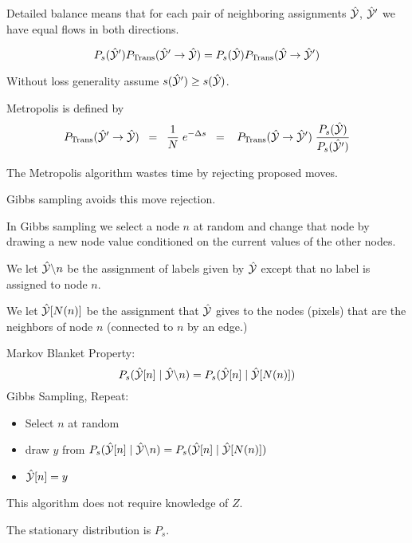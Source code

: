{

Detailed balance means that for each pair of neighboring assignments $\hat{\cal Y}$, $\hat{\cal Y}'$ we have equal flows in both directions.

\vfill
$$P_s(\hat{\cal Y}')P_{\mathrm{Trans}}(\hat{\cal Y}' \rightarrow \hat{\cal Y}) = P_s(\hat{\cal Y})P_{\mathrm{Trans}}(\hat{\cal Y} \rightarrow \hat{\cal Y}')$$

\vfill
Without loss generality assume $s(\hat{\cal Y}') \geq s(\hat{\cal Y})$.

\vfill
Metropolis is defined by
{\huge $$P_{\mathrm{Trans}}(\hat{\cal Y}' \rightarrow \hat{\cal Y}) \;\; = \;\; \frac{1}{N}\;e^{-\Delta s}
\;\;= \;\;\;P_{\mathrm{Trans}}(\hat{\cal Y} \rightarrow \hat{\cal Y}')\;\frac{P_s(\hat{\cal Y})}{P_s(\hat{\cal Y}')}$$}


The Metropolis algorithm wastes time by rejecting proposed moves.

\vfill
Gibbs sampling avoids this move rejection.

\vfill
In Gibbs sampling we select a node $n$ at random and change that node by drawing a new node value conditioned on the current values of the other nodes.

\vfill
We let {\color{red} $\hat{\cal Y} \backslash n$} be the assignment of labels given by $\hat{\cal Y}$ except that no label is assigned to node $n$.

\vfill
We let {\color{red} $\hat{\cal Y}[N(n)]$} be the assignment that $\hat{\cal Y}$ gives to the nodes (pixels) that are the neighbors of node $n$ (connected to $n$ by an edge.)


Markov Blanket Property:
{\color{red} $$P_s(\hat{\cal Y}[n] \;|\;\hat{\cal Y} \backslash n) = P_s(\hat{\cal Y}[n] \;|\; \hat{\cal Y}[N(n)])$$}
\vfill
Gibbs Sampling, Repeat:

\begin{itemize}
\item   Select $n$ at random

\item {\color{red} draw $y$ from $P_s(\hat{\cal Y}[n]\;|\;\hat{\cal Y} \backslash n) = P_s(\hat{\cal Y}[n] \;|\;\hat{\cal Y}[N(n)])$}

\item $\hat{\cal Y}[n] = y$
\end{itemize}

\vfill
This algorithm does not require knowledge of $Z$.

\vfill
The stationary distribution is $P_s$.


}


